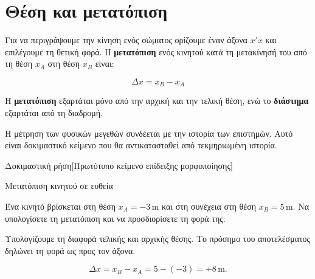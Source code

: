 \section{Θέση και μετατόπιση}
Για να περιγράψουμε την κίνηση ενός σώματος ορίζουμε έναν άξονα \(x'x\) και επιλέγουμε τη θετική φορά. Η \textbf{μετατόπιση} ενός κινητού κατά τη μετακίνησή του από τη θέση \(x_A\) στη θέση \(x_B\) είναι:
\begin{KeyFormula}
\[ \Delta x=x_B-x_A \]
\end{KeyFormula}
\begin{center}
\end{center}
\begin{AttentionBox}
Η \textbf{μετατόπιση} εξαρτάται μόνο από την αρχική και την τελική θέση, ενώ το \textbf{διάστημα} εξαρτάται από τη διαδρομή.
\end{AttentionBox}
\begin{HistoryBox}
Η μέτρηση των φυσικών μεγεθών συνδέεται με την ιστορία των επιστημών.
Αυτό είναι δοκιμαστικό κείμενο που θα αντικατασταθεί από τεκμηριωμένη ιστορία.
\end{HistoryBox}
{Δοκιμαστική ρήση}[Πρωτότυπο κείμενο επίδειξης μορφοποίησης]
\begin{workedexample}{Μετατόπιση κινητού σε ευθεία}
\begin{ProblemBox}
Ένα κινητό βρίσκεται στη θέση \(x_A=-3\,\mathrm{m}\) και στη συνέχεια στη θέση \(x_B=5\,\mathrm{m}\). Να υπολογίσετε τη μετατόπιση και να προσδιορίσετε τη φορά της.
\end{ProblemBox}
\begin{ThinkBox}
Υπολογίζουμε τη διαφορά τελικής και αρχικής θέσης. Το πρόσημο του αποτελέσματος δηλώνει τη φορά ως προς τον άξονα.
\end{ThinkBox}
\SolutionHeading
\[\Delta x=x_B-x_A=5-(-3)=+8\,\mathrm{m}.\]
\end{workedexample}
